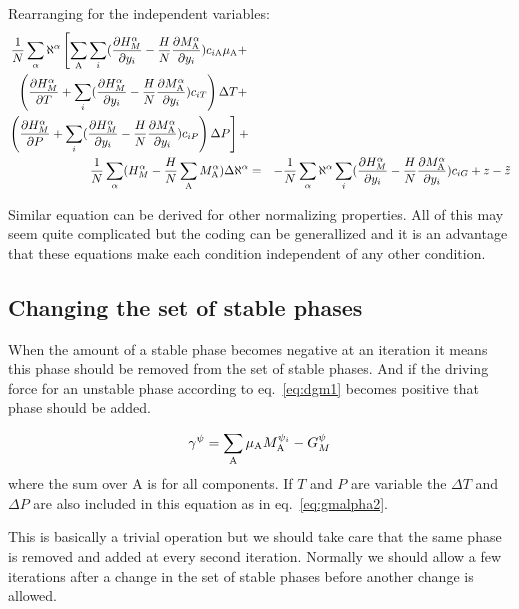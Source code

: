 \documentclass[12pt]{article}
\begin{document}
Rearranging for the independent variables:
\begin{eqnarray}
\frac{1}{N}\sum_{\alpha}\aleph^{\alpha}\left[\sum_{\rm A}\sum_i(\frac{\partial H^{\alpha}_M}{\partial y_i}-
\frac{H}{N}\frac{\partial M_{\rm A}^{\alpha}}{\partial y_i})c_{i\rm A}\mu_{\rm A}+\right.\nonumber\\
\left.\left(\frac{\partial H^{\alpha}_M}{\partial T}+\sum_i(\frac{\partial H^{\alpha}_M}{\partial y_i}-\frac{H}{N}\frac{\partial M_{\rm A}^{\alpha}}{\partial y_i})c_{iT}\right)\Delta T+\right.\nonumber\\
\left.\left(\frac{\partial H^{\alpha}_M}{\partial P}+\sum_i(\frac{\partial H^{\alpha}_M}{\partial y_i}-\frac{H}{N}\frac{\partial M_{\rm A}^{\alpha}}{\partial y_i})c_{iP}\right)\Delta P\right]+\nonumber\\
\frac{1}{N}\sum_{\alpha} (H^{\alpha}_M -
\frac{H}{N}\sum_{\rm A}M^{\alpha}_{\rm A})\Delta\aleph^{\alpha}&=&
- \frac{1}{N}\sum_{\alpha}\aleph^{\alpha}\sum_i(\frac{\partial H^{\alpha}_M}{\partial y_i}-\frac{H}{N}\frac{\partial M_{\rm A}^{\alpha}}{\partial y_i})c_{iG} +  z-\tilde z\nonumber\\
\end{eqnarray}

Similar equation can be derived for other normalizing properties.  All
of this may seem quite complicated but the coding can be generallized
and it is an advantage that these equations make each condition
independent of any other condition.

\subsection{Changing the set of stable phases}\label{sc:changeps}

When the amount of a stable phase becomes negative at an iteration it
means this phase should be removed from the set of stable phases.  And
if the driving force for an unstable phase according to
eq.~\ref{eq:dgm1} becomes positive that phase should be added.

\begin{equation}
\gamma^{\psi} = \sum_{\rm A} \mu_{\rm A} M_{\rm A}^{\psi_i} - G^{\psi}_M \label{eq:dgm2}
\end{equation}
where the sum over A is for all components.  If $T$ and $P$ are
variable the $\Delta T$ and $\Delta P$ are also included in this
equation as in eq.~\ref{eq:gmalpha2}.

This is basically a trivial operation but we should take care that
the same phase is removed and added at every second iteration.
Normally we should allow a few iterations after a change in the
set of stable phases before another change is allowed.
\end{document}
